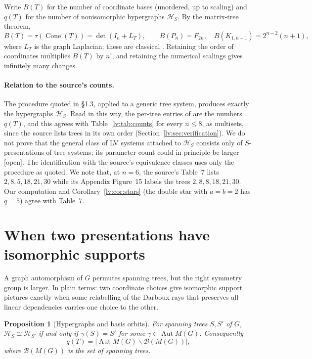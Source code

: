 \documentclass[11pt,a4paper]{article}
\newtheorem{proposition}[theorem]{Proposition}
\theoremstyle{definition}
\theoremstyle{remark}
\newcommand{\Cone}{\operatorname{Cone}}
\newcommand{\Aut}{\operatorname{Aut}}
\newcommand{\lab}[1]{\textsf{[#1]}}
\begin{document}
Write $B(T)$ for the number of coordinate bases (unordered, up to scaling) and $q(T)$ for the number of nonisomorphic hypergraphs $\mathcal H_S$. By the matrix-tree theorem,
\begin{equation}
 B(T)=\tau(\Cone(T))=\det(I_n+L_T),
 \qquad
 B(P_n)=F_{2n},\quad B(K_{1,n-1})=2^{n-2}(n+1),
 \label{lv:eq:basis-count}
\end{equation}
where $L_T$ is the graph Laplacian; these are classical \cite{lv:RS2024}. Retaining the order of coordinates multiplies $B(T)$ by $n!$, and retaining the numerical scalings gives infinitely many changes.

\paragraph{Relation to the source's counts.}
The procedure quoted in \S1.3, applied to a generic tree system, produces exactly the hypergraphs $\mathcal H_S$. Read in this way, the per-tree entries of \cite[Table~7]{lv:K2025} are the numbers $q(T)$, and this agrees with Table~\ref{lv:tab:counts} for every $n\leq8$, as multisets, since the source lists trees in its own order (Section~\ref{lv:sec:verification}). We do not prove that the general class of LV systems attached to $\mathcal H_S$ consists only of $S$-presentations of tree systems; its parameter count could in principle be larger \lab{open}. The identification with the source's equivalence classes uses only the procedure as quoted. We note that, at $n=6$, the source's Table~7 lists $2,8,5,18,21,30$ while its Appendix Figure~15 labels the trees $2,8,8,18,21,30$. Our computation and Corollary~\ref{lv:cor:stars} (the double star with $a=b=2$ has $q=5$) agree with Table~7.

\section{When two presentations have isomorphic supports}
\label{lv:sec:orbits}

A graph automorphism of $G$ permutes spanning trees, but the right symmetry group is larger. In plain terms: two coordinate choices give isomorphic support pictures exactly when some relabelling of the Darboux rays that preserves all linear dependencies carries one choice to the other.

\begin{proposition}[Hypergraphs and basis orbits]
\label{lv:prop:orbit-equivalence}
For spanning trees $S,S'$ of $G$,
\(
 \mathcal H_S\cong\mathcal H_{S'}
\)
if and only if $\gamma(S)=S'$ for some $\gamma\in\Aut M(G)$. Consequently
\begin{equation}
 q(T)=\bigl|\Aut M(G)\backslash\mathcal B(M(G))\bigr|,
 \label{lv:eq:orbit-count}
\end{equation}
where $\mathcal B(M(G))$ is the set of spanning trees.
\end{proposition}
\end{document}
